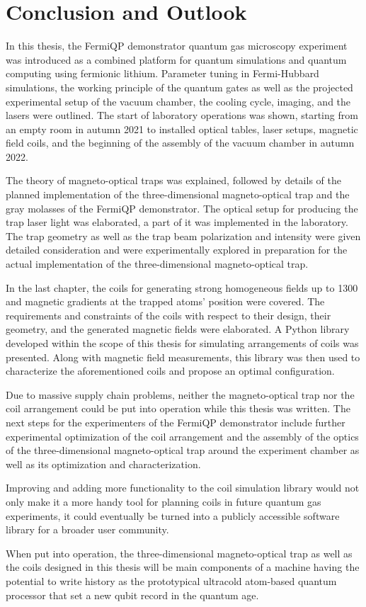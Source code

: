\renewcommand{\imagepath}{../50-outro/img}

\chapter{Conclusion and Outlook}
In this thesis, the FermiQP demonstrator quantum gas microscopy experiment was introduced as a combined platform for quantum simulations and quantum computing using fermionic lithium. Parameter tuning in Fermi-Hubbard simulations, the working principle of the quantum gates as well as the projected experimental setup of the vacuum chamber, the cooling cycle, imaging, and the lasers were outlined. The start of laboratory operations was shown, starting from an empty room in autumn 2021 to installed optical tables, laser setups, magnetic field coils, and the beginning of the assembly of the vacuum chamber in autumn 2022.

The theory of magneto-optical traps was explained, followed by details of the planned implementation of the three-dimensional magneto-optical trap and the gray molasses of the FermiQP demonstrator. The optical setup for producing the trap laser light was elaborated, a part of it was implemented in the laboratory. The trap geometry as well as the trap beam polarization and intensity were given detailed consideration and were experimentally explored in preparation for the actual implementation of the three-dimensional magneto-optical trap.

In the last chapter, the coils for generating strong homogeneous fields up to \SI[]{1300}{\gauss} and magnetic gradients at the trapped atoms' position were covered. The requirements and constraints of the coils with respect to their design, their geometry, and the generated magnetic fields were elaborated. A Python library developed within the scope of this thesis  for simulating arrangements of coils was presented. Along with magnetic field measurements, this library was then used to characterize the aforementioned coils and propose an optimal configuration.

Due to massive supply chain problems, neither the magneto-optical trap nor the coil arrangement could be put into operation while this thesis was written. The next steps for the experimenters of the FermiQP demonstrator include further experimental optimization of the coil arrangement and the assembly of the optics of the three-dimensional magneto-optical trap around the experiment chamber as well as its optimization and  characterization.

Improving and adding more functionality to the coil simulation library would not only make it a more handy tool for planning coils in future quantum gas experiments, it could eventually be turned into a publicly accessible software library for a broader user community.

When put into operation, the three-dimensional magneto-optical trap as well as the coils designed in this thesis will be main components of a machine having the potential to write history as the prototypical ultracold atom-based quantum processor that set a new qubit record in the quantum age.